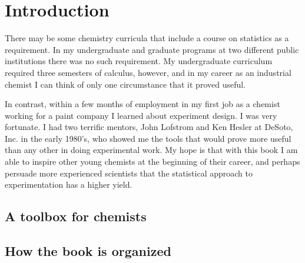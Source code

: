 \chapter{Introduction}

There may be some chemistry curricula that include a course on statistics as a requirement. In my undergraduate and graduate programs at two different public institutions there was no such requirement. My undergraduate curriculum required three semesters of calculus, however, and in my career as an industrial chemist I can think of only one circumstance that it proved useful.

In contrast, within a few months of employment in my first job as a chemist working for a paint company I learned about experiment design. I was very fortunate.  I had two terrific mentors, John Lofstrom and Ken Hesler at DeSoto, Inc. in the early 1980's, who showed me the tools that would prove more useful than any other in doing experimental work. My hope is that with this book I am able to inspire other young chemists at the beginning of their career, and perhaps persuade more experienced scientists that the statistical approach to experimentation has a higher yield.


\section*{A toolbox for chemists}


\section*{How the book is organized}


\cleardoublepage